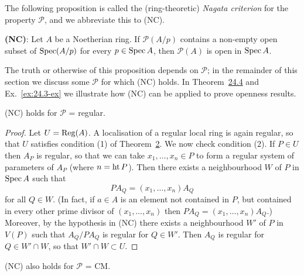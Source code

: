 The following proposition is called the (ring-theoretic) \emph{Nagata criterion}
for the property $\mathcal{P}$, and we abbreviate this to (NC).

\textbf{(NC)}: Let $A$ be a Noetherian ring. If $\mathcal{P}(A/p)$ contains a non-empty open
subset of $\operatorname{Spec}(A/p)$ for every $p \in \operatorname{Spec} A$, then $\mathcal{P}(A)$ is open in
$\operatorname{Spec} A$.

The truth or otherwise of this proposition depends on $\mathcal{P}$; in the
remainder of this section we discuss some $\mathcal{P}$ for which (NC) holds. In
Theorem~\hyperref[thm:24.4]{24.4} and Ex.~\ref{ex:24.3-ex} we illustrate how (NC) can be applied to
prove openness results.

\begin{theorem}[Nagata]\label{thm:24.4}
(NC) holds for $\mathcal{P}$ = regular.
\end{theorem}

\begin{proof}
Let $U = \operatorname{Reg}(A)$. A localisation of a regular local ring is again regular, so
that $U$ satisfies condition (1) of Theorem~\hyperref[thm:24.2]{2}. We now check condition (2). If
$P \in U$ then $A_P$ is regular, so that we can take $x_1, \ldots, x_n \in P$ to form a
regular system of parameters of $A_P$ (where $n = \operatorname{ht} P$). Then there exists a
neighbourhood $W$ of $P$ in $\operatorname{Spec} A$ such that
\[
  PA_Q = (x_1, \ldots, x_n)A_Q
\]
for all $Q \in W$. (In fact, if $a \in A$ is an element not contained in $P$, but
contained in every other prime divisor of $(x_1, \ldots, x_n)$ then
$PA_Q = (x_1, \ldots, x_n)A_Q$.) Moreover, by the hypothesis in (NC) there exists a
neighbourhood $W'$ of $P$ in $V(P)$ such that $A_Q/PA_Q$ is regular for $Q \in W'$.
Then $A_Q$ is regular for $Q \in W' \cap W$, so that $W' \cap W \subset U$.
\end{proof}

\begin{theorem}\label{thm:24.5}
(NC) also holds for $\mathcal{P}$ = CM.
\end{theorem}

